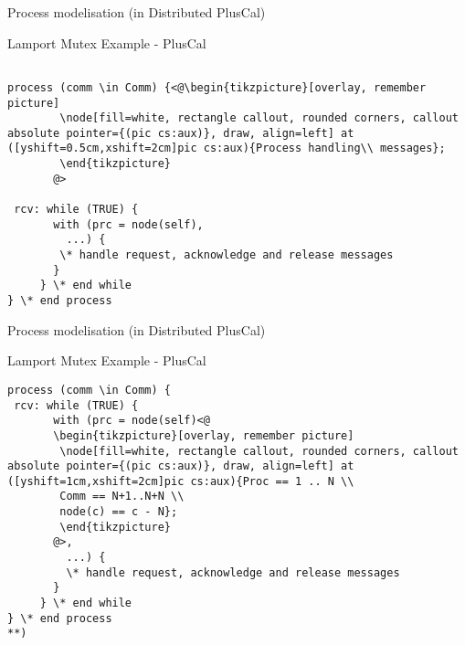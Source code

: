 \documentclass{beamer}
\begin{document}
\begin{frame}[fragile]{Process modelisation (in Distributed PlusCal)}
        \begin{exampleblock}{Lamport Mutex Example - PlusCal}
        \begin{lstlisting}[language=pluscal, frame = none, numbers = none]
        
process (comm \in Comm) {<@\begin{tikzpicture}[overlay, remember picture]
        \node[fill=white, rectangle callout, rounded corners, callout absolute pointer={(pic cs:aux)}, draw, align=left] at ([yshift=0.5cm,xshift=2cm]pic cs:aux){Process handling\\ messages};
        \end{tikzpicture}
       @>
                    
 rcv: while (TRUE) {
       with (prc = node(self),
         ...) {
        \* handle request, acknowledge and release messages
       }
     } \* end while
} \* end process
\end{lstlisting}
\end{exampleblock}
\end{frame}

\begin{frame}[fragile]{Process modelisation (in Distributed PlusCal)}
\begin{exampleblock}{Lamport Mutex Example - PlusCal}
        \begin{lstlisting}[language=pluscal, frame = none, numbers = none]
process (comm \in Comm) {
 rcv: while (TRUE) {
       with (prc = node(self)<@
       \begin{tikzpicture}[overlay, remember picture]
        \node[fill=white, rectangle callout, rounded corners, callout absolute pointer={(pic cs:aux)}, draw, align=left] at ([yshift=1cm,xshift=2cm]pic cs:aux){Proc == 1 .. N \\
        Comm == N+1..N+N \\
        node(c) == c - N};
        \end{tikzpicture}
       @>,
         ...) {
         \* handle request, acknowledge and release messages
       }
     } \* end while
} \* end process
**)
\end{lstlisting}
\end{exampleblock}
\end{frame}
\end{document}

